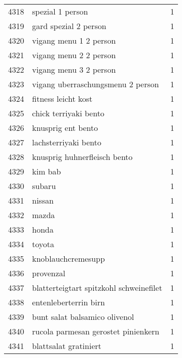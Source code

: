 \begin{tabular}{llr}
4318 &                                   spezial 1 person &      1 \\
4319 &                              gard spezial 2 person &      1 \\
4320 &                             vigang menu 1 2 person &      1 \\
4321 &                             vigang menu 2 2 person &      1 \\
4322 &                             vigang menu 3 2 person &      1 \\
4323 &                  vigang uberraschungsmenu 2 person &      1 \\
4324 &                                fitness leicht kost &      1 \\
4325 &                              chick terriyaki bento &      1 \\
4326 &                                 knusprig ent bento &      1 \\
4327 &                               lachsterriyaki bento &      1 \\
4328 &                       knusprig huhnerfleisch bento &      1 \\
4329 &                                            kim bab &      1 \\
4330 &                                             subaru &      1 \\
4331 &                                             nissan &      1 \\
4332 &                                              mazda &      1 \\
4333 &                                              honda &      1 \\
4334 &                                             toyota &      1 \\
4335 &                                 knoblauchcremesupp &      1 \\
4336 &                                          provenzal &      1 \\
4337 &            blatterteigtart spitzkohl schweinefilet &      1 \\
4338 &                              entenleberterrin birn &      1 \\
4339 &                      bunt salat balsamico olivenol &      1 \\
4340 &                rucola parmesan gerostet pinienkern &      1 \\
4341 &                              blattsalat gratiniert &      1 \\

\end{tabular}
